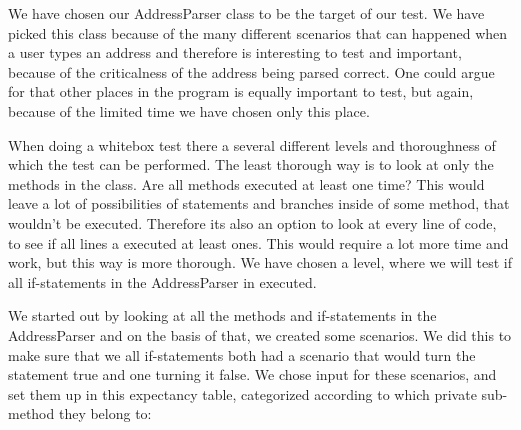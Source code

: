 \documentclass[a4paper,10pt,titlepage]{article}
\begin{document}
We have chosen our AddressParser class to be the target of our test. We have picked this class because of the many different scenarios that can happened when a user types an address and therefore is interesting to test and important, because of the criticalness of the address being parsed correct. One could argue for that other places in the program is equally important to test, but again, because of the limited time we have chosen only this place. 

When doing a whitebox test there a several different levels and thoroughness of which the test can be performed. The least thorough way is to look at only the methods in the class. Are all methods executed at least one time? This would leave a lot of possibilities of statements and branches inside of some method, that wouldn't be executed. Therefore its also an option to look at every line of code, to see if all lines a executed at least ones. This would require a lot more time and work, but this way is more thorough. We have chosen a level, where we will test if all if-statements in the AddressParser in executed. 

We started out by looking at all the methods and if-statements in the AddressParser and on the basis of that, we created some scenarios. We did this to make sure that we all if-statements both had a scenario that would turn the statement true and one turning it false. We chose input for these scenarios, and set them up in this expectancy table, categorized according to which private sub-method they belong to:
\end{document}

